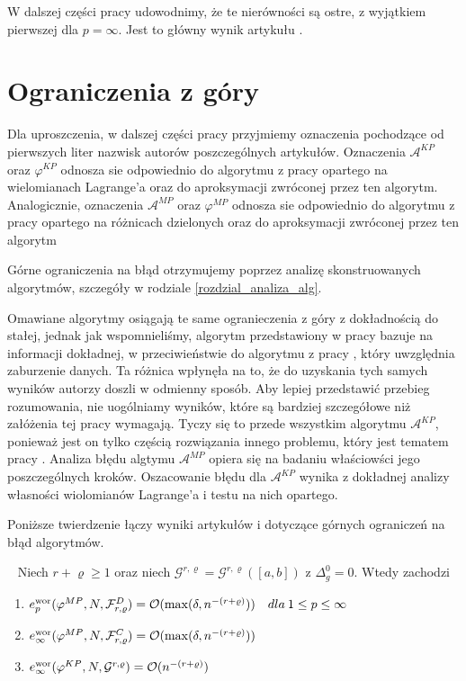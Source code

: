 \documentclass[oik, pdftex, robocza, man]{mgrwms}
\begin{document}
    W dalszej części pracy udowodnimy, że te nierówności są ostre, z wyjątkiem pierwszej dla $p=\infty$. Jest to główny wynik artykułu \cite{AoP}.


\section{Ograniczenia z góry}


    Dla uproszczenia, w dalszej części pracy przyjmiemy oznaczenia pochodzące od pierwszych liter nazwisk autorów poszczególnych artykułów. Oznaczenia $\mathcal{A}^{KP}$ oraz $\varphi^{KP}$ odnosza sie odpowiednio do algorytmu z pracy \cite{CoDF} opartego na wielomianach Lagrange'a oraz do aproksymacji zwróconej przez ten algorytm. Analogicznie, oznaczenia $\mathcal{A}^{MP}$ oraz $\varphi^{MP}$ odnosza sie odpowiednio do algorytmu z pracy \cite{AoP} opartego na różnicach dzielonych oraz do aproksymacji zwróconej przez ten algorytm

    Górne ograniczenia na błąd otrzymujemy poprzez analizę skonstruowanych algorytmów, szczegóły w rodziale \ref{rozdzial_analiza_alg}.
    
    Omawiane algorytmy osiągają te same ogranieczenia z góry z dokładnością do stałej, jednak jak wspomnieliśmy, algorytm przedstawiony w pracy \cite{CoDF} bazuje na informacji dokładnej, w przeciwieństwie do algorytmu z pracy \cite{AoP}, który uwzględnia zaburzenie danych. Ta różnica wpłynęła na to, że do uzyskania tych samych wyników autorzy doszli w odmienny sposób. Aby lepiej przedstawić przebieg rozumowania, nie uogólniamy wyników, które są bardziej szczegółowe niż załóżenia tej pracy wymagają. Tyczy się to przede wszystkim algorytmu $\mathcal{A}^{KP}$, ponieważ jest on tylko częścią rozwiązania innego problemu, który jest tematem pracy \cite{CoDF}. Analiza błędu algtymu $\mathcal{A}^{MP}$ opiera się na badaniu właściowści jego poszczególnych kroków. Oszacowanie błędu dla $\mathcal{A}^{KP}$ wynika z dokładnej analizy własności wiolomianów Lagrange'a i testu na nich opartego.

    Poniższe twierdzenie łączy wyniki artykułów \cite{CoDF} i \cite{AoP} dotyczące górnych ograniczeń na błąd algorytmów.
    
    \begin{thm}~%
        Niech $r+\varrho \geq 1$ oraz niech $\mathcal{G}^{r,\varrho} = \mathcal{G}^{r,\varrho}([a,b])$ z $\Delta_{g}^{0} = 0$. Wtedy zachodzi
        \begin{enumerate}[label=(\roman*)]
            \item $e_{p}^{\mathrm{wor}}(\varphi^{MP},N,\mathcal{F}_{r,\varrho}^{D}) = \mathcal{O}(\max(\delta, n^{-(r+\varrho)})) \quad dla \: 1 \leq p \leq \infty$
            \item $e_{\infty}^{\mathrm{wor}}(\varphi^{MP},N,\mathcal{F}_{r,\varrho}^{C}) = \mathcal{O}(\max(\delta, n^{-(r+\varrho)}))$
            \item $e_{\infty}^{\mathrm{wor}}(\varphi^{KP},N,\mathcal{G}^{r,\varrho}) = \mathcal{O}(n^{-(r+\varrho)})$
        \end{enumerate}
    \end{thm}
\end{document}
